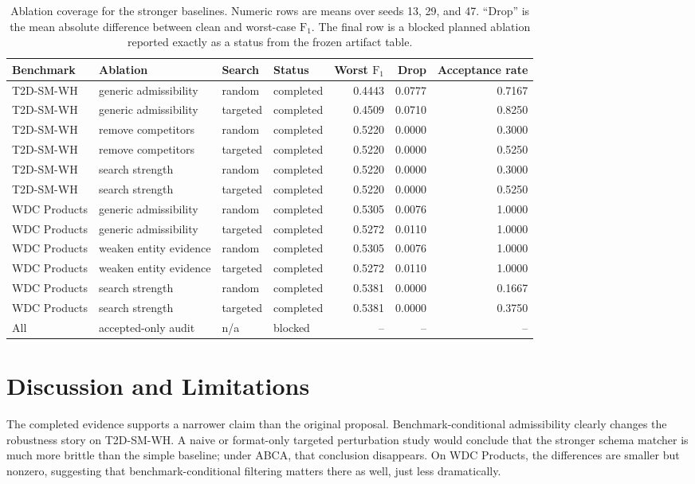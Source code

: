 \documentclass{article}
\newcommand{\abca}{\textsc{ABCA}}
\newcommand{\fonescore}{\ensuremath{\mathrm{F}_{1}}}
\begin{document}
\begin{table}[t]
\caption{Ablation coverage for the stronger baselines. Numeric rows are means over seeds 13, 29, and 47. ``Drop'' is the mean absolute difference between clean and worst-case \fonescore{}. The final row is a blocked planned ablation reported exactly as a status from the frozen artifact table.}
\label{tab:ablations}
\centering
\small
\begin{tabular}{llllrrr}
\toprule
Benchmark & Ablation & Search & Status & Worst \fonescore{} & Drop & Acceptance rate \\
\midrule
T2D-SM-WH & generic admissibility & random & completed & 0.4443 & 0.0777 & 0.7167 \\
T2D-SM-WH & generic admissibility & targeted & completed & 0.4509 & 0.0710 & 0.8250 \\
T2D-SM-WH & remove competitors & random & completed & 0.5220 & 0.0000 & 0.3000 \\
T2D-SM-WH & remove competitors & targeted & completed & 0.5220 & 0.0000 & 0.5250 \\
T2D-SM-WH & search strength & random & completed & 0.5220 & 0.0000 & 0.3000 \\
T2D-SM-WH & search strength & targeted & completed & 0.5220 & 0.0000 & 0.5250 \\
\midrule
WDC Products & generic admissibility & random & completed & 0.5305 & 0.0076 & 1.0000 \\
WDC Products & generic admissibility & targeted & completed & 0.5272 & 0.0110 & 1.0000 \\
WDC Products & weaken entity evidence & random & completed & 0.5305 & 0.0076 & 1.0000 \\
WDC Products & weaken entity evidence & targeted & completed & 0.5272 & 0.0110 & 1.0000 \\
WDC Products & search strength & random & completed & 0.5381 & 0.0000 & 0.1667 \\
WDC Products & search strength & targeted & completed & 0.5381 & 0.0000 & 0.3750 \\
\midrule
All & accepted-only audit & n/a & blocked & -- & -- & -- \\
\bottomrule
\end{tabular}
\end{table}

\section{Discussion and Limitations}
\label{sec:discussion}
The completed evidence supports a narrower claim than the original proposal. Benchmark-conditional admissibility clearly changes the robustness story on T2D-SM-WH. A naive or format-only targeted perturbation study would conclude that the stronger schema matcher is much more brittle than the simple baseline; under \abca{}, that conclusion disappears. On WDC Products, the differences are smaller but nonzero, suggesting that benchmark-conditional filtering matters there as well, just less dramatically.
\end{document}
